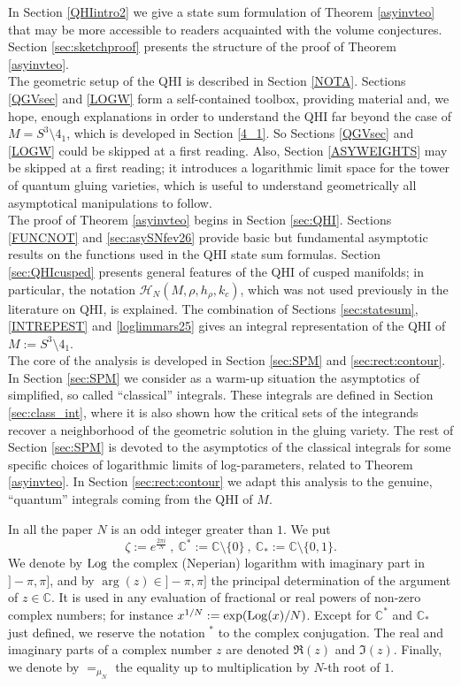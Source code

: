 \documentclass[11pt]{amsart}
\newcommand{\mc}{\mathbb{C}}
\newcommand{\Log}{{\rm Log}}
\newcommand{\Hh}{{\mathcal H}}
\begin{document}
 In Section \ref{QHIintro2} we give a state sum formulation of Theorem \ref{asyinvteo} that may be more accessible to readers acquainted with the volume conjectures. Section \ref{sec:sketchproof} presents the structure of the proof of Theorem \ref{asyinvteo}.\\
The geometric setup of the QHI is described in Section \ref{NOTA}. Sections \ref{QGVsec} and \ref{LOGW} form a self-contained toolbox, providing material and, we hope, enough explanations in order to understand the QHI far beyond the case of  $M=S^3\setminus 4_1$, which is developed in Section \ref{4_1}. So Sections \ref{QGVsec} and \ref{LOGW} could be skipped at a first reading. Also, Section \ref{ASYWEIGHTS} may be skipped at a first reading; it introduces a logarithmic limit space for the tower of quantum gluing varieties, which is useful to understand geometrically all asymptotical manipulations to follow.\\ The proof of Theorem \ref{asyinvteo} begins in Section \ref{sec:QHI}. Sections \ref{FUNCNOT} and \ref{sec:asySNfev26} provide basic but fundamental asymptotic results on the functions used in the QHI state sum formulas. Section \ref{sec:QHIcusped} presents general features of the QHI of cusped manifolds; in particular, the notation $\Hh_{N}(M,\rho,h_\rho,k_c)$, which was not used previously in the literature on QHI, is explained. The combination of Sections \ref{sec:statesum}, \ref{INTREPEST} and \ref{loglimmars25} gives an integral representation of the QHI of $M:=S^3\setminus 4_1$.\\ The core of the analysis is developed in Section \ref{sec:SPM} and \ref{sec:rect:contour}. In Section \ref{sec:SPM} we consider as a warm-up situation the asymptotics of simplified, so called ``classical'' integrals. These integrals are defined in Section \ref{sec:class_int}, where it is also shown how the critical sets of the integrands recover a neighborhood of the geometric solution in the gluing variety. The rest of Section \ref{sec:SPM} is devoted to the asymptotics of the classical integrals for some specific choices of logarithmic limits of log-parameters, related to Theorem \ref{asyinvteo}.  In Section \ref{sec:rect:contour} we adapt this analysis to the genuine, ``quantum'' integrals coming from the QHI of $M$.  
\medskip

 In all the paper $N$ is an odd integer greater than $1$. We put $$\zeta := e^{\frac{2\pi i}{N}}\ ,\ \mc^*:= \mc\setminus \{0\}\ ,\ \mc_* := \mc\setminus \{0,1\}.$$
We denote by $\Log$ the complex (Neperian) logarithm with imaginary part in $]-\pi,\pi]$, and by $\arg(z)\in ]-\pi,\pi]$ the principal determination of the argument of $z\in \mc$. It is used in any evaluation of fractional or real powers of non-zero complex numbers; for instance $x^{1/N} := \exp(\Log(x)/N)$. Except for $\mc^*$ and $\mc_*$ just defined, we reserve the notation ${}^*$ to the complex conjugation. The real and imaginary parts of a complex number $z$ are denoted $\mathfrak{R}(z)$ and $\mathfrak{I}(z)$. Finally, we denote by $=_{\mu_N}$ the equality up to multiplication by $N$-th root of $1$.
\medskip
\end{document}
